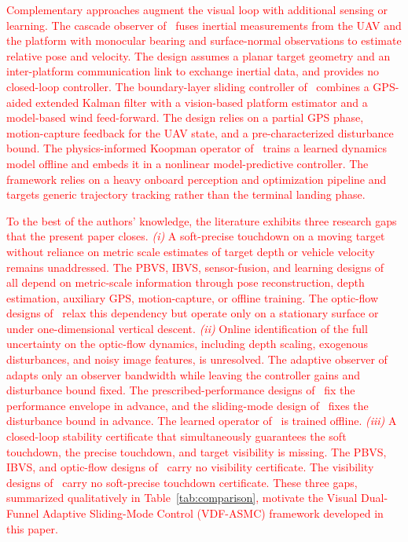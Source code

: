 \documentclass{IEEEtaes}
\newcommand{\new}[1]{\textcolor{red}{#1}}
\begin{document}
\new{Complementary approaches augment the visual loop with additional sensing or learning. The cascade observer of~\cite{bouazza2025} fuses inertial measurements from the UAV and the platform with monocular bearing and surface-normal observations to estimate relative pose and velocity. The design assumes a planar target geometry and an inter-platform communication link to exchange inertial data, and provides no closed-loop controller. The boundary-layer sliding controller of~\cite{paris2020} combines a GPS-aided extended Kalman filter with a vision-based platform estimator and a model-based wind feed-forward. The design relies on a partial GPS phase, motion-capture feedback for the UAV state, and a pre-characterized disturbance bound. The physics-informed Koopman operator of~\cite{kamath2026} trains a learned dynamics model offline and embeds it in a nonlinear model-predictive controller. The framework relies on a heavy onboard perception and optimization pipeline and targets generic trajectory tracking rather than the terminal landing phase.}

\new{To the best of the authors' knowledge, the literature exhibits three research gaps that the present paper closes. \emph{(i)} A soft-precise touchdown on a moving target without reliance on metric scale estimates of target depth or vehicle velocity remains unaddressed. The PBVS, IBVS, sensor-fusion, and learning designs of~\cite{lin2022, zhang2026, cho2022, lin2023, bouazza2025, paris2020, kamath2026} all depend on metric-scale information through pose reconstruction, depth estimation, auxiliary GPS, motion-capture, or offline training. The optic-flow designs of~\cite{herisse2012, izzo2011, singhal2025} relax this dependency but operate only on a stationary surface or under one-dimensional vertical descent. \emph{(ii)} Online identification of the full uncertainty on the optic-flow dynamics, including depth scaling, exogenous disturbances, and noisy image features, is unresolved. The adaptive observer of~\cite{zhang2026} adapts only an observer bandwidth while leaving the controller gains and disturbance bound fixed. The prescribed-performance designs of~\cite{lin2022, lin2023} fix the performance envelope in advance, and the sliding-mode design of~\cite{paris2020} fixes the disturbance bound in advance. The learned operator of~\cite{kamath2026} is trained offline. \emph{(iii)} A closed-loop stability certificate that simultaneously guarantees the soft touchdown, the precise touchdown, and target visibility is missing. The PBVS, IBVS, and optic-flow designs of~\cite{lin2022, zhang2026, cho2022, lin2023, herisse2012, izzo2011, singhal2025} carry no visibility certificate. The visibility designs of~\cite{salehi2021, xie2016} carry no soft-precise touchdown certificate. These three gaps, summarized qualitatively in Table~\ref{tab:comparison}, motivate the Visual Dual-Funnel Adaptive Sliding-Mode Control (VDF-ASMC) framework developed in this paper.}
\end{document}
